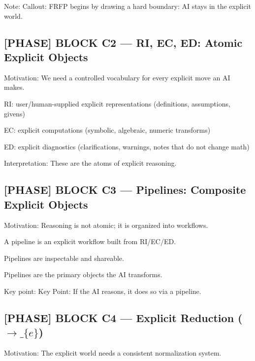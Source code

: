 Note: Callout: FRFP begins by drawing a hard boundary: AI stays in the explicit world.\par

\subsection*{[PHASE] BLOCK C2 --- RI, EC, ED: Atomic Explicit Objects}

Motivation: We need a controlled vocabulary for every explicit move an AI makes.\par

RI: user/human-supplied explicit representations (definitions, assumptions, givens)\par

EC: explicit computations (symbolic, algebraic, numeric transforms)\par

ED: explicit diagnostics (clarifications, warnings, notes that do not change math)\par

 Interpretation: These are the atoms of explicit reasoning.\par

\subsection*{[PHASE] BLOCK C3 --- Pipelines: Composite Explicit Objects}

Motivation: Reasoning is not atomic; it is organized into workflows.\par

A pipeline is an explicit workflow built from RI/EC/ED.\par

Pipelines are inspectable and shareable.\par

Pipelines are the primary objects the AI transforms.\par

Key point: Key Point: If the AI reasons, it does so via a pipeline.\par

\subsection*{[PHASE] BLOCK C4 --- Explicit Reduction ($\to\_\{e\}$)}

Motivation: The explicit world needs a consistent normalization system.\par

